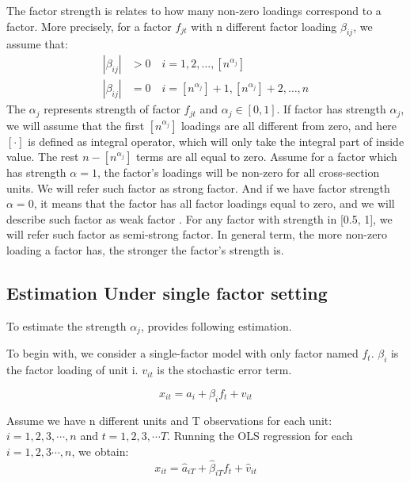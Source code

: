 The factor strength is relates to how many non-zero loadings correspond to a factor.
More precisely, for a factor $f_{jt}$ with n different factor loading $\beta_{ij}$, we assume that:
\begin{align*}
|\beta_{ij}| &> 0\quad i = 1, 2,  \dots, [n^{\alpha_j}]\\
|\beta_{ij}| &= 0 \quad i = [n^{\alpha_j}] + 1, [n^{\alpha_j}] +2 ,\dots, n
\end{align*}
The $\alpha_j$ represents strength of factor $f_{jt}$ and $\alpha_j \in [0,1]$.
If factor has strength $\alpha_j$, we will assume that the first $[n^{\alpha_j}]$ loadings are all different from zero, and here $[\cdot] $  is defined as integral operator, which will only take the integral part of inside value.%
The rest $n - [n^{\alpha_j}]$ terms are all equal to zero. %
Assume for a factor which has strength $\alpha = 1$, the factor's loadings will be non-zero for all cross-section units.
We will refer such factor as strong factor.
And if we have factor strength $\alpha = 0$, it means that the factor has all factor loadings equal to zero, and we will describe such factor as weak factor \cite{Bailey2016}.
For any factor with strength in [0.5, 1], we will refer such factor as semi-strong factor.
In general term, the more non-zero loading a factor has, the stronger the factor's strength is. 

	\subsection{Estimation Under single factor setting}\label{strength_one_factor_estimation}
To estimate the strength $\alpha_j$,  provides following estimation.

To begin with, we consider a single-factor model with only factor named $f_t$. 
 $\beta_{i}$ is the factor loading of unit i.
$v_{it}$ is the stochastic error term.

\[  x_{it} = a_{i} +  \beta_{i}f_{t} + v_{it} \tag{2} \label{estimation_model}\]

Assume we have n different units and T observations for each unit: $i = 1, 2, 3, \cdots, n$ and $t = 1,2,3, \cdots T$.
Running the OLS regression for each $i = 1,2,3\cdots, n$, we obtain:
\[   x_{it} = \hat{a}_{iT} +  \hat{\beta}_{iT}f_{t} + \hat{v}_{it}  \]

